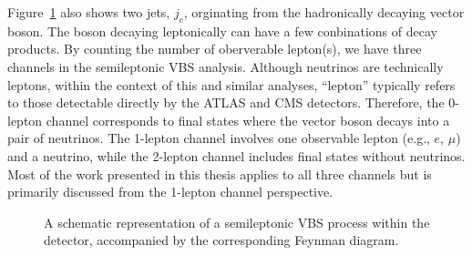 Figure~\ref{fig:semi_vbs} also shows two jets, $j_{c}$, orginating from the hadronically decaying vector boson. 
The boson decaying leptonically can have a few conbinations of decay products. 
By counting the number of oberverable lepton(s), we have three channels in the semileptonic VBS analysis. 
Although neutrinos are technically leptons, within the context of this and similar analyses, ``lepton'' typically refers to those detectable directly by the ATLAS and CMS detectors.
Therefore, the 0-lepton channel corresponds to final states where the vector boson decays into a pair of neutrinos.
The 1-lepton channel involves one observable lepton (e.g., $e$, $\mu$) and a neutrino, while the 2-lepton channel includes final states without neutrinos. Most of the work presented in this thesis applies to all three channels but is primarily discussed from the 1-lepton channel perspective.

\begin{figure}[tbp]
\centering
{}
\caption{
A schematic representation of a semileptonic VBS process within the detector, accompanied by the corresponding Feynman diagram.
}
\label{fig:semi_vbs}
\end{figure}


